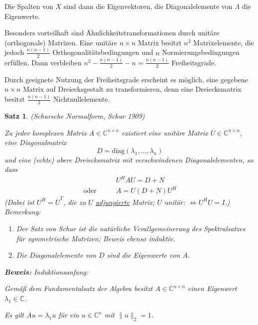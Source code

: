 \documentclass[%
a4paper,
11pt,		%
leqno,		%
]
{scrartcl}
\theoremstyle{plain}
\theoremstyle{plain}
\newtheorem{mysatz}[mydef]{Satz}
\theoremstyle{plain}
\begin{document}
Die Spalten von $X$ sind dann die Eigenvektoren, die Diagonalelemente von $\Lambda$ die Eigenwerte.

Besonders vorteilhaft sind Ähnlichkeitstransformationen durch unitäre (orthogonale) Matrizen. Eine unitäre $n \times n$ Matrix besitzt $n^2$ Matrixelemente, die jedoch $\frac{n(n-1)}{2}$ Orthogonalitätsbedingungen und $n$ Normierungsbedingungen erfüllen.
Dann verbleiben $n^2 - \frac{n(n-1)}{2} -n = \frac{n(n-1)}{2}$ Freiheitsgrade. 

Durch geeignete Nutzung der Freiheitsgrade erscheint es möglich, eine gegebene $n \times n$ Matrix auf Dreiecksgestalt zu transformieren, denn eine Dreiecksmatrix besitzt $\frac{n(n-1)}{2}$ Nichtnullelemente.  

\begin{mysatz}
(Schursche Normalform, Schur 1909)

Zu jeder komplexen Matrix $A \in \mathbb{C}^{n \times n}$ existiert eine unitäre Matrix $U \in \mathbb{C}^{n \times n}$, eine Diagonalmatrix 
\[
D = \text{diag}(\lambda_1, \ldots, \lambda_n)
\]
und eine (echte) obere Dreiecksmatrix mit verschwindenen Diagonalelementen, so dass 
\begin{align*}
 & U^H A U = D + N \\
 \text{oder} \qquad & A = U(D+N)U^H
\end{align*}
(Dabei ist $U^H = \overline{U}^T$, die zu $U$ \uline{adjungierte} Matrix; $U$ unitär: $\Leftrightarrow U^HU = I$.)\\

\textit{Bemerkung:}
\begin{enumerate}
    \item Der Satz von Schur ist die natürliche Verallgemeinerung des Spektralsatzes für symmetrische Matrizen; Beweis ebenso induktiv.
    \item Die Diagonalelemente von $D$ sind die Eigenwerte von $A$.
\end{enumerate}
\textbf{Beweis:} Induktionsanfang:

Gemäß dem Fundamentalsatz der Algebra besitzt $A \in \mathbb{C}^{n \times n}$ einen Eigenwert $\lambda_1 \in \mathbb{C}$.

Es gilt $Au = \lambda_1 u$ für ein $u \in \mathbb{C}^n$ mit $\| u \|_2 = 1$.


\end{mysatz}
\end{document}

